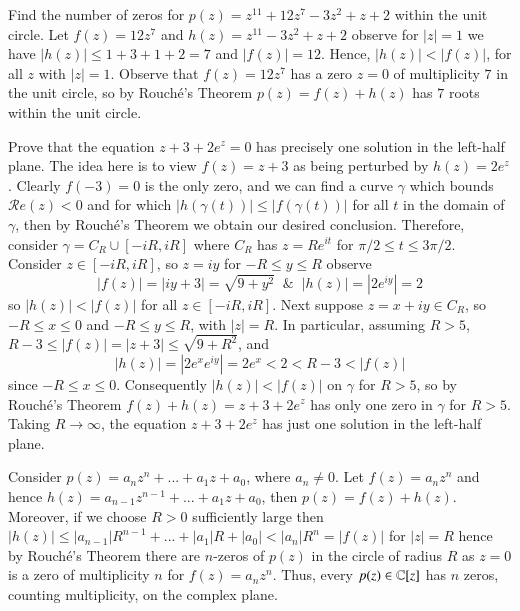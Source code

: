 \documentclass[12pt, a4paper, oneside, openright, titlepage]{book}
\begin{document}
\begin{eg}
    Find the number of zeros for $p(z) = z^{11}+12z^7-3z^2+z+2$ within the unit circle. Let $f(z) = 12z^7$ and $h(z) = z^{11}-3z^2+z+2$ observe for $|z| = 1$ we have $|h(z)| \leq 1+3+1+2 = 7$ and $|f(z)| = 12$. Hence, $|h(z)| < |f(z)|$, for all $z$ with $|z| = 1$. Observe that $f(z) = 12z^7$ has a zero $z = 0$ of multiplicity $7$ in the unit circle, so by Rouch\'{e}'s Theorem $p(z) = f(z)+h(z)$ has $7$ roots within the unit circle.
\end{eg}

\begin{eg}
    Prove that the equation $z+3+2e^z = 0$ has precisely one solution in the left-half plane. The idea here is to view $f(z) = z+3$ as being perturbed by $h(z) = 2e^z$. Clearly $f(-3) = 0$ is the only zero, and we can find a curve $\gamma$ which bounds $\mathscr{R}e(z) < 0$ and for which $|h(\gamma(t))| \leq |f(\gamma(t))|$ for all $t$ in the domain of $\gamma$, then by Rouch\'{e}'s Theorem we obtain our desired conclusion. Therefore, consider $\gamma = C_R\cup [-iR,iR]$ where $C_R$ has $z = Re^{it}$ for $\pi/2 \leq t \leq 3\pi/2$. Consider $z \in [-iR,iR]$, so $z = iy$ for $-R \leq y \leq R$ observe \begin{equation*}
        |f(z)| = |iy+3| = \sqrt{9+y^2}\;\;\&\;\;|h(z)| = |2e^{iy}| = 2
    \end{equation*}
    so $|h(z)| < |f(z)|$ for all $z \in [-iR,iR]$. Next suppose $z =x+iy \in C_R$, so $-R\leq x \leq 0$ and $-R\leq y \leq R$, with $|z| = R$. In particular, assuming $R > 5$, $R-3\leq |f(z)| = |z+3| \leq \sqrt{9+R^2}$, and $$|h(z)| = |2e^xe^{iy}| = 2e^x < 2 < R-3 < |f(z)|$$ since $-R \leq x \leq 0$. Consequently $|h(z)| < |f(z)|$ on $\gamma$ for $R > 5$, so by Rouch\'{e}'s Theorem $f(z)+h(z) = z+3+2e^z$ has only one zero in $\gamma$ for $R > 5$. Taking $R\rightarrow \infty$, the equation $z+3+2e^z$ has just one solution in the left-half plane.
\end{eg}

\begin{eg}
    Consider $p(z) = a_nz^n+...+a_1z+a_0$, where $a_n \neq 0$. Let $f(z) = a_nz^n$ and hence $h(z) = a_{n-1}z^{n-1}+...+a_1z+a_0$, then $p(z) = f(z)+h(z)$. Moreover, if we choose $R > 0$ sufficiently large then $|h(z)| \leq |a_{n-1}|R^{n-1} + ... + |a_1|R+|a_0| < |a_n|R^n = |f(z)|$ for $|z| = R$ hence by Rouch\'{e}'s Theorem there are $n$-zeros of $p(z)$ in the circle of radius $R$ as $z = 0$ is a zero of multiplicity $n$ for $f(z) = a_nz^n$. Thus, every $p(z) \in \mathbb C[z]$ has $n$ zeros, counting multiplicity, on the complex plane.
\end{eg}
\end{document}
